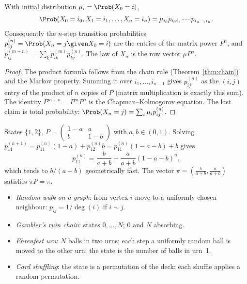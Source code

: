 \begin{proposition}\label{prop:ck}
With initial distribution $\mu_i=\Prob(X_0=i)$,
\[
\Prob(X_0=i_0,X_1=i_1,\dots,X_n=i_n)=\mu_{i_0}p_{i_0i_1}\cdots p_{i_{n-1}i_n}.
\]
Consequently the $n$-step transition probabilities
$p_{ij}^{(n)}=\Prob(X_n=j\given X_0=i)$ are the entries of the matrix power $P^n$, and
$p^{(m+n)}_{ij}=\sum_kp^{(m)}_{ik}p^{(n)}_{kj}$. The law of $X_n$ is the row vector
$\mu P^n$.
\end{proposition}
\begin{proof}
The product formula follows from the chain rule (Theorem~\ref{thm:chain}) and the
Markov property. Summing it over $i_1,\dots,i_{n-1}$ gives $p_{ij}^{(n)}$ as the $(i,j)$
entry of the product of $n$ copies of $P$ (matrix multiplication is exactly this sum).
The identity $P^{m+n}=P^mP^n$ is the Chapman--Kolmogorov equation. The last claim is
total probability: $\Prob(X_n=j)=\sum_i\mu_ip^{(n)}_{ij}$.
\end{proof}

\begin{example}\label{ex:twostate}
States $\{1,2\}$, $P=\begin{pmatrix}1-a&a\\b&1-b\end{pmatrix}$ with $a,b\in(0,1)$.
Solving $p^{(n+1)}_{11}=p^{(n)}_{11}(1-a)+p^{(n)}_{12}b=p^{(n)}_{11}(1-a-b)+b$ gives
\[
p^{(n)}_{11}=\frac b{a+b}+\frac a{a+b}(1-a-b)^n,
\]
which tends to $b/(a+b)$ geometrically fast. The vector $\pi=(\frac b{a+b},\frac a{a+b})$
satisfies $\pi P=\pi$.
\end{example}

\begin{example}
\begin{itemize}
\item \emph{Random walk on a graph}: from vertex $i$ move to a uniformly chosen
neighbour: $p_{ij}=1/\deg(i)$ if $i\sim j$.
\item \emph{Gambler's ruin chain}: states $0,\dots,N$; $0$ and $N$ absorbing.
\item \emph{Ehrenfest urn}: $N$ balls in two urns; each step a uniformly random ball is
moved to the other urn; the state is the number of balls in urn~1.
\item \emph{Card shuffling}: the state is a permutation of the deck; each shuffle
applies a random permutation.
\end{itemize}
\end{example}

